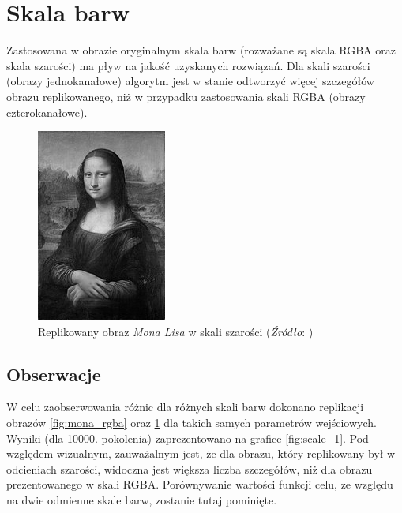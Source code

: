 \section{Skala barw}
\begin{hypothesis}
Zastosowana w obrazie oryginalnym skala barw (rozważane są skala RGBA oraz skala szarości) ma pływ na jakość uzyskanych rozwiązań. Dla skali szarości (obrazy jednokanałowe) algorytm jest w stanie odtworzyć więcej szczegółów obrazu replikowanego, niż w przypadku zastosowania skali RGBA (obrazy czterokanałowe).
\end{hypothesis}
\begin{figure}[!htb]
    \centering
    \includegraphics[scale=4.0]{images/mona/mona_bw.jpg}
    \caption{Replikowany obraz \textit{Mona Lisa} w skali szarości (\textit{Źródło}: \cite{MonaLisa})}
    \label{fig:monra_bw}
\end{figure}
\subsection{Obserwacje}
W celu zaobserwowania różnic dla różnych skali barw dokonano replikacji obrazów \ref{fig:mona_rgba} oraz \ref{fig:monra_bw} dla takich samych parametrów wejściowych. Wyniki (dla 10000. pokolenia) zaprezentowano na grafice \ref{fig:scale_1}. Pod względem wizualnym, zauważalnym jest, że dla obrazu, który replikowany był w odcieniach szarości, widoczna jest większa liczba szczegółów, niż dla obrazu prezentowanego w skali RGBA. Porównywanie wartości funkcji celu, ze względu na dwie odmienne skale barw, zostanie tutaj pominięte.

